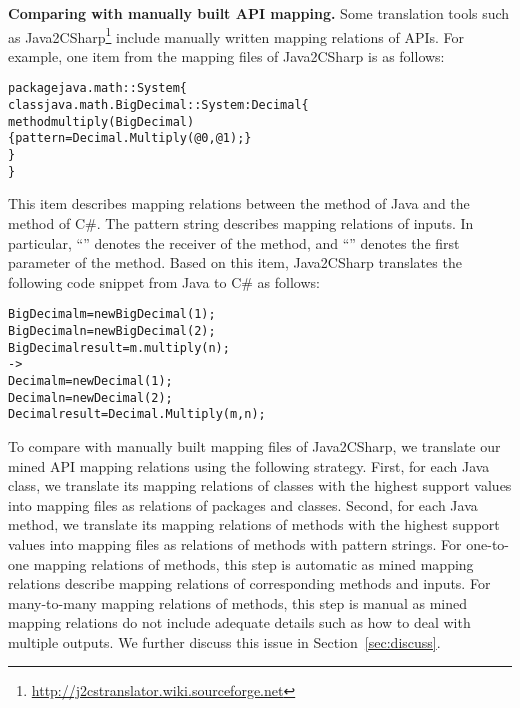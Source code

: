 \textbf{Comparing with manually built API mapping.} Some translation
tools such as
Java2CSharp\footnote{\url{http://j2cstranslator.wiki.sourceforge.net}}
include manually written mapping relations of APIs.
For example, one item from the mapping files of Java2CSharp is as
follows:

\begin{CodeOut}\vspace*{-2ex}
\begin{alltt}
package java.math :: System \{
  class java.math.BigDecimal :: System:Decimal \{
    method multiply(BigDecimal)
       \{ pattern =  Decimal.Multiply(@0, @1); \}
  \}
\}
\end{alltt}
\end{CodeOut}\vspace*{-2ex}

This item describes mapping relations between the 
method of Java and the  method of C\#. The pattern
string describes mapping relations of inputs. In particular,
``'' denotes the receiver of the 
method, and ``'' denotes the first parameter of the
 method. Based on this item, Java2CSharp translates
the following code snippet from Java to C\# as follows:

\begin{CodeOut}\vspace*{-2ex}
\begin{alltt}
  BigDecimal m = new BigDecimal(1);
  BigDecimal n = new BigDecimal(2);
  BigDecimal result = m.multiply(n);
  ->
  Decimal m = new Decimal(1);
  Decimal n = new Decimal(2);
  Decimal result = Decimal.Multiply(m,n);
\end{alltt}
\end{CodeOut}\vspace*{-2ex}

To compare with manually built mapping files of Java2CSharp, we
translate our mined API mapping relations using the following strategy. First,
for each Java class, we translate its mapping relations of classes
with the highest support values into mapping files as relations of
packages and classes. Second, for each Java method, we translate its
mapping relations of methods with the highest support values into mapping
files as relations of methods with pattern strings. For one-to-one
mapping relations of methods, this step is automatic as mined
mapping relations describe mapping relations of corresponding
methods and inputs. For many-to-many mapping relations of methods,
this step is manual as mined mapping relations do not include
adequate details such as how to deal with multiple outputs. We
further discuss this issue in Section~\ref{sec:discuss}.

